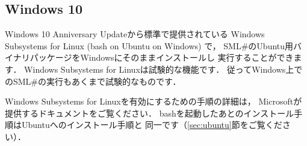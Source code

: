 \documentclass{jbook}
\newcommand{\txt}[2]{#2}
\newcommand{\smlsharp}{SML\#}
\newenvironment{program}{\begin{quote}\begin{tt}}%
                        {\end{tt}\end{quote}}
\begin{document}
\fi%

%
%
%
%
%

\subsection{\txt{Windows 10}{Windows 10}}

\ifjp%
	Windows 10 Anniversary Updateから標準で提供されている
Windows Subsystems for Linux (bash on Ubuntu on Windows) で，
\smlsharp{}のUbuntu用バイナリパッケージをWindowsにそのままインストールし
実行することができます．
	Windows Subsystems for Linuxは試験的な機能です．
	従ってWindows上での\smlsharp{}の実行もあくまで試験的なものです．

	Windows Subsystems for Linuxを有効にするための手順の詳細は，
Microsoftが提供するドキュメントをご覧ください．
	bashを起動したあとのインストール手順はUbuntuへのインストール手順と
同一です（\ref{sec:ubuntu}節をご覧ください）．
\end{document}
